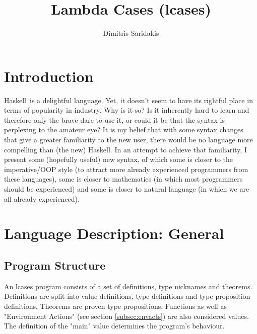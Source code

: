 \documentclass{article}
\date{}
\author{ Dimitris Saridakis }
\def\H{Haskell}
\begin{document}
\title{
\textbf{Lambda Cases (lcases)}
}
\maketitle

\tableofcontents

\newpage
\section{Introduction}

\H\ is a delightful language. Yet, it doesn't seem to have its rightful place
in terms of popularity in industry. Why is it so?  Is it inherently hard to
learn and therefore only the brave dare to use it, or could it be that the
syntax is perplexing to the amateur eye? It is my belief that with some syntax
changes that give a greater familiarity to the new user, there would be no
language more compelling than (the new) \H. In an attempt to achieve that
familiarity, I present some (hopefully useful) new syntax, of which some is
closer to the imperative/OOP style (to attract more already experienced
programmers from these languages), some is closer to mathematics (in which most
programmers should be experienced) and some is closer to natural language (in
which we are all already experienced).

\section{Language Description: General}

\subsection{Program Structure}

An lcases program consists of a set of definitions, type nicknames and
theorems.  Definitions are split into value definitions, type definitions and
type proposition definitions. Theorems are proven type propositions. Functions
as well as "Environment Actions" (see section \ref{subsec:envacts}) are also
considered values. The definition of the "main" value determines the program's
behaviour.
\end{document}
